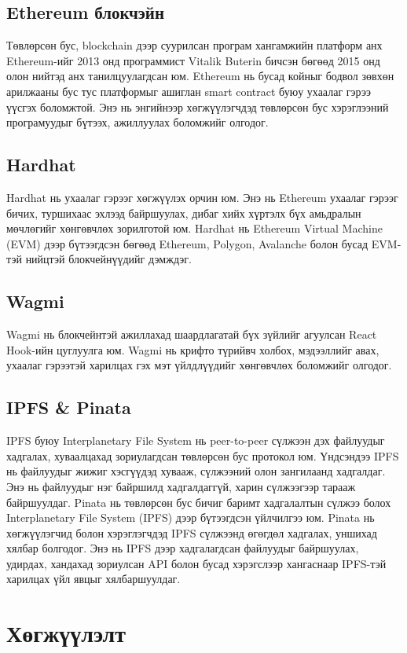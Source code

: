 \subsection{Ethereum блокчэйн}
Төвлөрсөн бус, blockchain дээр суурилсан програм хангамжийн платформ анх Ethereum-ийг 2013 онд программист Vitalik Buterin бичсэн бөгөөд 2015 онд олон нийтэд анх танилцуулагдсан юм. Ethereum нь бусад койныг бодвол зөвхөн арилжааны бус тус платформыг ашиглан smart contract буюу ухаалаг гэрээ үүсгэх боломжтой. Энэ нь энгийнээр хөгжүүлэгчдэд төвлөрсөн бус хэрэглээний програмуудыг бүтээх, ажиллуулах боломжийг олгодог.

\subsection{Hardhat}
Hardhat нь ухаалаг гэрээг хөгжүүлэх орчин юм. Энэ нь Ethereum ухаалаг гэрээг бичих, туршихаас эхлээд байршуулах, дибаг хийх хүртэлх бүх амьдралын мөчлөгийг хөнгөвчлөх зорилготой юм. Hardhat нь Ethereum Virtual Machine (EVM) дээр бүтээгдсэн бөгөөд Ethereum, Polygon, Avalanche болон бусад EVM-тэй нийцтэй блокчейнүүдийг дэмждэг.

\subsection{Wagmi}
Wagmi нь блокчейнтэй ажиллахад шаардлагатай бүх зүйлийг агуулсан React Hook-ийн цуглуулга юм. Wagmi нь крифто түрийвч холбох, мэдээллийг авах, ухаалаг гэрээтэй харилцах гэх мэт үйлдлүүдийг хөнгөвчлөх боломжийг олгодог.

\subsection{IPFS \& Pinata}
IPFS буюу Interplanetary File System нь peer-to-peer сүлжээн дэх файлуудыг хадгалах, хуваалцахад зориулагдсан төвлөрсөн бус протокол юм. Үндсэндээ IPFS нь файлуудыг жижиг хэсгүүдэд хувааж, сүлжээний олон зангилаанд хадгалдаг. Энэ нь файлуудыг нэг байршилд хадгалдаггүй, харин сүлжээгээр тарааж байршуулдаг.
Pinata нь төвлөрсөн бус бичиг баримт хадгалалтын сүлжээ болох Interplanetary File System (IPFS) дээр бүтээгдсэн үйлчилгээ юм. Pinata нь хөгжүүлэгчид болон хэрэглэгчдэд IPFS сүлжээнд өгөгдөл хадгалах, уншихад хялбар болгодог. Энэ нь IPFS дээр хадгалагдсан файлуудыг байршуулах, удирдах, хандахад зориулсан API болон бусад хэрэгслээр хангаснаар IPFS-тэй харилцах үйл явцыг хялбаршуулдаг.

\newpage
\section{Хөгжүүлэлт}

